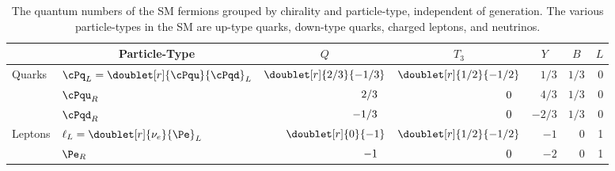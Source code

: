 \begin{table}[htbp]
	\caption{The quantum numbers of the SM fermions grouped by chirality and particle-type, independent of generation. The various particle-types in the SM are up-type quarks, down-type quarks, charged leptons, and neutrinos.}
	\centering
    \begin{tabular}{|l|l|r|r|r|r|r|}
\hline
      & \multicolumn{1}{c|}{Particle-Type} & \multicolumn{1}{c|}{$Q$} & \multicolumn{1}{c|}{$T_3$} & \multicolumn{1}{c|}{$Y$} & \multicolumn{1}{c|}{$B$} & \multicolumn{1}{c|}{$L$} \\
\hline
\multirow{3}{*}{Quarks}  
\rule{0pt}{24pt}         & $\cPq_L = \doublet[r]{\cPqu}{\cPqd}_L$ & $\doublet[r]{2/3}{-1/3}$ & $\doublet[r]{1/2}{-1/2}$ & $1/3$  & $1/3$ & 0 \\
                         & $\cPqu_R$                              & $2/3\hphantom{\bigg)}$   & $0\hphantom{\bigg)}$     & $4/3$  & $1/3$ & 0 \\
                         & $\cPqd_R$                              & $-1/3\hphantom{\bigg)}$  & $0\hphantom{\bigg)}$     & $-2/3$ & $1/3$ & 0 \\
\hline
\multirow{2}{*}{Leptons} 
\rule{0pt}{24pt}         & $\ell_L = \doublet[r]{\nu_{e}}{\Pe}_L$ & $\doublet[r]{0}{-1}$     & $\doublet[r]{1/2}{-1/2}$ & $-1$   & 0     & 1 \\
                         & $\Pe_R$                                & $-1\hphantom{\bigg)}$    & $0\hphantom{\bigg)}$     & $-2$   & 0     & 1 \\
\hline
    \end{tabular}
	\label{tab:fermion_quantum_numbers}
\end{table}


